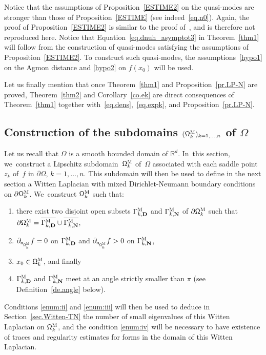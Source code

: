 \documentclass[JEP,XML,SOM,Unicode,NoEqCountersInSection,NoFloatCountersInSection,published]{cedram}
\newenvironment{enumeratei}
{\bgroup\def\theenumi{\roman{enumi}}\def\theenumii{\arabic{enumii}}\begin{enumerate}}
{\end{enumerate}\egroup}
\newcommand{\mbf}[1]{\mathbf{#1}}
\let\pa\partial
\theoremstyle{plain}
\theoremstyle{definition}
\begin{document}
Notice that the assumptions of Proposition~\ref{ESTIME2} on the
quasi-modes are stronger than those of Proposition~\ref{ESTIME} (see indeed~\eqref{eq.n0}).
Again, the proof of Proposition~\ref{ESTIME2} is similar to the proof
of~\cite[Prop.\,25]{DLLN}, and is therefore not reproduced
here. Notice that Equation~\eqref{eq.dnuh_asymptot3} in
Theorem~\ref{thm1} will follow from the construction of quasi-modes
satisfying the assumptions of Proposition~\ref{ESTIME2}. To construct such quasi-modes, the assumptions~\eqref{hypo1} on the Agmon distance and \eqref{hypo2} on $f(x_0)$ will be used.

Let us finally mention that once Theorem~\ref{thm1} and Proposition~\ref{pr.LP-N} are proved, Theorem~\ref{thm2} and Corollary~\ref{co.ek} are direct consequences of Theorem~\ref{thm1} together with~\eqref{eq.dens},~\eqref{eq.expk}, and Proposition~\ref{pr.LP-N}.

\subsection{Construction of the subdomains $(\mathsf
\Omega_k^{\textsc{M}})_{k=1,\ldots,n}$ of $\Omega$}\label{sec:omegakM}
Let us recall that $\Omega$ is a smooth bounded domain of $\mathbb R^d$. In~this section, we~construct a Lipschitz subdomain~$\mathsf \Omega_k^{\textsc{M}}$ of~$\Omega$ associated with each saddle point $z_k$ of~$f$ in $\partial \Omega$, $k=1,\ldots,n$. This subdomain will then be used to define in the next section a Witten Laplacian
with mixed Dirichlet-Neumann boundary
conditions on $\pa \mathsf \Omega_k^{\textsc{M}}$. We~construct
$\mathsf \Omega_k^{\textsc{M}}$ such that:
\begin{enumeratei}
\item\label{enum:i}
there exist
two disjoint open subsets $\Gamma_{k,\mbf D}^{\textsc{M}}$ and $\Gamma_{k,\mbf N}^{\textsc{M}}$ of $\pa \mathsf \Omega_k^{\textsc{M}}$ such that $\partial \mathsf
\Omega_k^{\textsc{M}} = \overline{\Gamma_{k,\mbf D}^{\textsc{M}}} \cup
\overline{\Gamma_{k,\mbf N}^{\textsc{M}}}$,

\item\label{enum:ii}
$\partial_{\mathsf n_{ \mathsf
\Omega_k^{\textsc{M}} } }f=0$ on $\Gamma_{k,\mbf D}^{\textsc{M}}$
and $\partial_{\mathsf n_{ \mathsf \Omega_k^{\textsc{M}} } }f>0$ on
$\Gamma_{k,\mbf N}^{\textsc{M}}$,

\item\label{enum:iii}
$x_0\in \mathsf
\Omega_k^{\textsc{M}}$, and finally 

\item\label{enum:iv}
$\Gamma_{k,\mbf D}^{\textsc{M}}$ and $\Gamma_{k,\mbf N}^{\textsc{M}}$ meet at an angle strictly smaller than $\pi$ (see Definition~\ref{de.angle} below). 
\end{enumeratei}
Conditions \eqref{enum:ii} and \eqref{enum:iii} will then be used to deduce in Section~\ref{sec.Witten-TN} the number of small eigenvalues of this Witten Laplacian on $\mathsf \Omega_k^{\textsc{M}}$, and the condition \eqref{enum:iv} will be necessary to have existence of traces and regularity estimates for forms in the domain of this Witten Laplacian.
\end{document}
